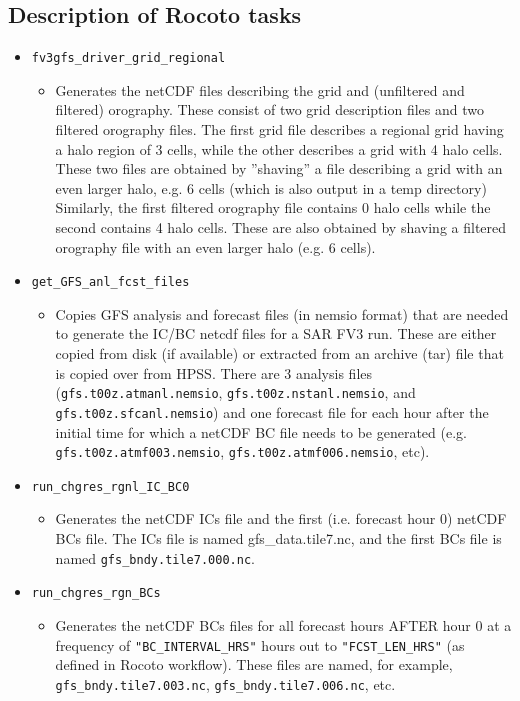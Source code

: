 \subsection{Description of Rocoto tasks}

\begin{itemize}
\item \verb|fv3gfs_driver_grid_regional|
    \begin{itemize}
    \item Generates the netCDF files describing the grid and (unfiltered and filtered) orography.  These consist of two grid description files and two filtered orography files.  The first grid file describes a regional grid having a halo region of 3 cells, while the other describes a grid with 4 halo cells.  These two files are obtained by ''shaving'' a file describing a grid with an even larger halo, e.g. 6 cells (which is also output in a temp directory)  Similarly, the first filtered orography file contains 0 halo cells while the second contains 4 halo cells.  These are also obtained by shaving a filtered orography file with an even larger halo (e.g. 6 cells).
    \end{itemize}
\item \verb|get_GFS_anl_fcst_files|
    \begin{itemize}
    \item Copies GFS analysis and forecast files (in nemsio format) that are needed to generate the IC/BC netcdf files for a SAR FV3 run.  These are either copied from disk (if available) or extracted from an archive (tar) file that is copied over from HPSS.  There are 3 analysis files (\verb|gfs.t00z.atmanl.nemsio|, \verb|gfs.t00z.nstanl.nemsio|, and \verb|gfs.t00z.sfcanl.nemsio|) and one forecast file for each hour after the initial time for which a netCDF BC file needs to be generated (e.g. \verb|gfs.t00z.atmf003.nemsio|, \verb|gfs.t00z.atmf006.nemsio|, etc). 
    \end{itemize}
\item \verb|run_chgres_rgnl_IC_BC0|
    \begin{itemize}
    \item Generates the netCDF ICs file and the first (i.e. forecast hour 0) netCDF BCs file.  The ICs file is named gfs\_data.tile7.nc, and the first BCs file is named \verb|gfs_bndy.tile7.000.nc|.
    \end{itemize}
\item \verb|run_chgres_rgn_BCs|
    \begin{itemize}
    \item Generates the netCDF BCs files for all forecast hours AFTER hour 0 at a frequency of \verb|"BC_INTERVAL_HRS"| hours out to \verb|"FCST_LEN_HRS"| (as defined in Rocoto workflow).  These files are named, for example, \verb|gfs_bndy.tile7.003.nc|, \verb|gfs_bndy.tile7.006.nc|, etc.

\end{itemize}
\end{itemize}
